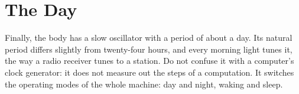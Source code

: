 \section*{The Day}

Finally, the body has a slow oscillator with a period of about a day. Its natural period differs slightly from twenty-four hours, and every morning light tunes it, the way a radio receiver tunes to a station. Do not confuse it with a computer's clock generator: it does not measure out the steps of a computation. It switches the operating modes of the whole machine: day and night, waking and sleep.

